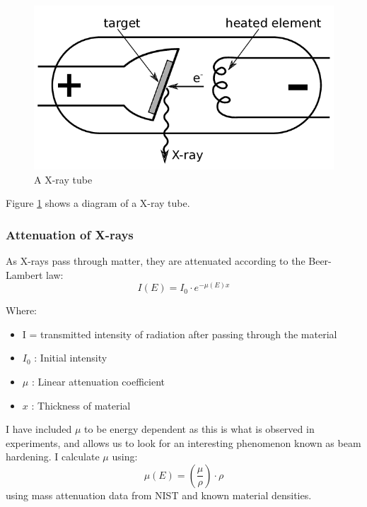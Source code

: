 \documentclass{article}
\begin{document}
\begin{figure}
  \includegraphics[width=\linewidth]{xray_tube.png}
  \caption{A X-ray tube}
  \label{fig:X-ray tube}
\end{figure}
Figure \ref{fig:X-ray tube} shows a diagram of a X-ray tube. \cite{Mason}

\subsubsection{Attenuation of X-rays}
As X-rays pass through matter, they are attenuated according to the Beer-Lambert law: 
\begin{equation} \label{bl}
I(E) = I_0 \cdot e^{-\mu(E) x}
\end{equation}

Where:
\begin{itemize}
  \item I = transmitted intensity of radiation after passing through the material
  \item $I_0$ : Initial intensity
  \item $\mu$ : Linear attenuation coefficient
  \item $x$ : Thickness of material
\end{itemize}

I have included  $\mu$ to be energy dependent as this is what is observed in experiments, and allows us to look for an interesting phenomenon known as beam hardening. I calculate $\mu$ using:
\begin{equation} \label{linearatt}
\mu(E) = \left(\frac{\mu}{\rho}\right) \cdot \rho
\end{equation}
using mass attenuation data from NIST and known material densities.



\end{document}
